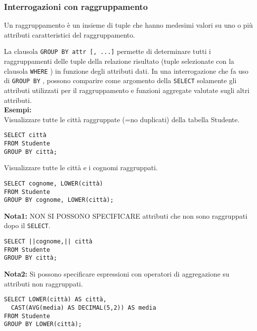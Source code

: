 \documentclass[a4paper, 10pt, titlepage]{article}
\begin{document}
	\subsubsection{Interrogazioni con raggruppamento}
		Un raggruppamento è un insieme di tuple che hanno medesimi valori su
		uno o più attributi caratteristici del raggruppamento.
		
		\noindent
		La clausola \lstinline|GROUP BY attr [, ...]| permette di determinare tutti i
		raggruppamenti delle tuple della relazione risultato (tuple selezionate
		con la clausola \lstinline|WHERE| ) in funzione degli attributi dati.
		In una interrogazione che fa uso di \lstinline|GROUP BY| , possono comparire come
		argomento della \lstinline|SELECT| solamente gli attributi utilizzati per il
		raggruppamento e funzioni aggregate valutate sugli altri attributi.\medskip \\
		\textbf{Esempi: }\\		
		Visualizzare tutte le città raggruppate (=no duplicati) della tabella Studente.
		\begin{lstlisting}
SELECT città
FROM Studente
GROUP BY città;
		\end{lstlisting}
		Visualizzare tutte le città e i cognomi raggruppati.
		\begin{lstlisting}[mathescape]
SELECT cognome, LOWER(città)
FROM Studente
GROUP BY cognome, LOWER(città);
		\end{lstlisting}
		\textbf{Nota1: }NON SI POSSONO SPECIFICARE attributi che non sono raggruppati dopo il
		\lstinline|SELECT|.
		
		
		\begin{lstlisting}
SELECT ||cognome,|| città
FROM Studente
GROUP BY città;
		\end{lstlisting}
		
		\noindent
		\textbf{Nota2: }Si possono specificare espressioni con operatori di aggregazione su attributi
		non raggruppati.
		\begin{lstlisting}
SELECT LOWER(città) AS città,
  CAST(AVG(media) AS DECIMAL(5,2)) AS media
FROM Studente
GROUP BY LOWER(città);
		\end{lstlisting}
		
\end{document}

